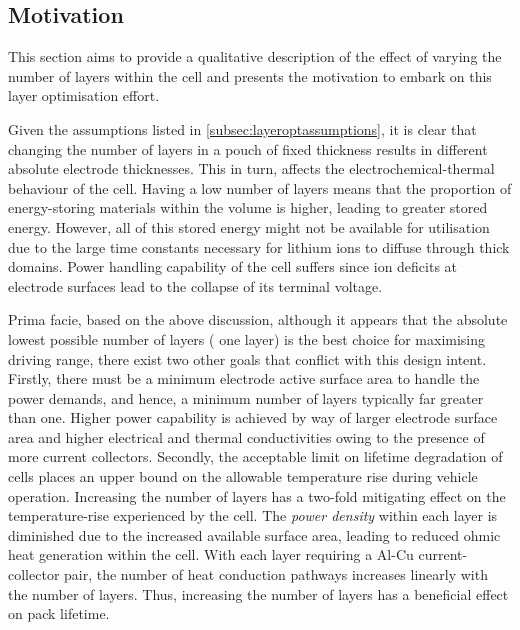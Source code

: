 \subsection{Motivation}\label{subsec:layeroptmotivation}

This section aims to provide a  qualitative description of the effect of varying
the number of  layers within the cell  and presents the motivation  to embark on
this layer optimisation effort.

Given the  assumptions listed in \cref{subsec:layeroptassumptions},  it is clear
that  changing the  number  of layers  in  a pouch  of  fixed thickness  results
in  different  absolute  electrode  thicknesses.   This  in  turn,  affects  the
electrochemical-thermal behaviour  of the  cell. Having a  low number  of layers
means  that the  proportion of  energy-storing  materials within  the volume  is
higher, leading  to greater stored  energy. However,  all of this  stored energy
might not be available for utilisation due to the large time constants necessary
for lithium ions to diffuse through  thick domains. Power handling capability of
the cell suffers  since ion deficits at electrode surfaces  lead to the collapse
of its terminal voltage.

Prima  facie, based  on  the  above discussion,  although  it  appears that  the
absolute lowest possible  number of layers (\ie{} one layer)  is the best choice
for maximising  driving range, there  exist two  other goals that  conflict with
this design  intent. Firstly, there must  be a minimum electrode  active surface
area  to  handle the  power  demands,  and hence,  a  minimum  number of  layers
typically far  greater than one. Higher  power capability is achieved  by way of
larger electrode surface  area and higher electrical  and thermal conductivities
owing to the presence of more current collectors. Secondly, the acceptable limit
on  lifetime  degradation of  cells  places  an  upper  bound on  the  allowable
temperature rise during vehicle operation. Increasing the number of layers has a
two-fold mitigating effect on the  temperature-rise experienced by the cell. The
\emph{power  density} within  each  layer  is diminished  due  to the  increased
available  surface area,  leading to  reduced ohmic  heat generation  within the
cell. With  each layer requiring a  Al-Cu current-collector pair, the  number of
heat conduction  pathways increases  linearly with the  number of  layers. Thus,
increasing the number of layers has a beneficial effect on pack lifetime.

